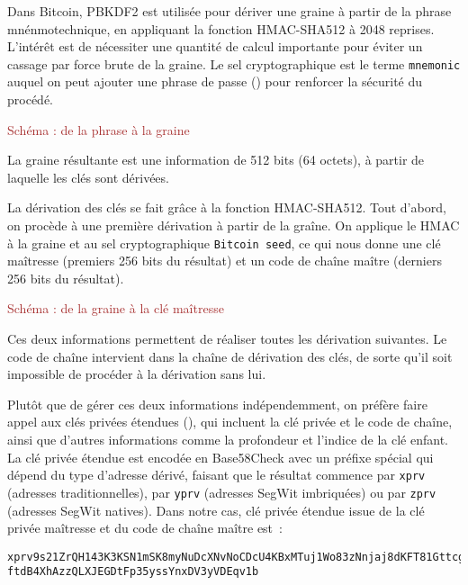 Dans Bitcoin, PBKDF2 est utilisée pour dériver une graine à partir de la phrase mnénmotechnique, en appliquant la fonction HMAC-SHA512 à 2048 reprises. L'intérêt est de nécessiter une quantité de calcul importante pour éviter un cassage par force brute de la graine. Le sel cryptographique est le terme \verb?mnemonic? auquel on peut ajouter une phrase de passe () pour renforcer la sécurité du procédé.

\textcolor{brown}{Schéma : de la phrase à la graine}

La graine résultante est une information de 512 bits (64 octets), à partir de laquelle les clés sont dérivées.


La dérivation des clés se fait grâce à la fonction HMAC-SHA512. Tout d'abord, on procède à une première dérivation à partir de la graîne. On applique le HMAC à la graine et au sel cryptographique \verb?Bitcoin seed?, ce qui nous donne une clé maîtresse (premiers 256 bits du résultat) et un code de chaîne maître (derniers 256 bits du résultat). 

\textcolor{brown}{Schéma : de la graine à la clé maîtresse}


Ces deux informations permettent de réaliser toutes les dérivation suivantes. Le code de chaîne intervient dans la chaîne de dérivation des clés, de sorte qu'il soit impossible de procéder à la dérivation sans lui.

Plutôt que de gérer ces deux informations indépendemment, on préfère faire appel aux clés privées étendues (), qui incluent la clé privée et le code de chaîne, ainsi que d'autres informations comme la profondeur et l'indice de la clé enfant. La clé privée étendue est encodée en Base58Check avec un préfixe spécial qui dépend du type d'adresse dérivé, faisant que le résultat commence par \verb?xprv? (adresses traditionnelles), par \verb?yprv? (adresses SegWit imbriquées) ou par \verb?zprv? (adresses SegWit natives). Dans notre cas, clé privée étendue issue de la clé privée maîtresse et du code de chaîne maître est~:

\begin{Verbatim}[fontsize=\footnotesize]
xprv9s21ZrQH143K3KSN1mSK8myNuDcXNvNoCDcU4KBxMTuj1Wo83zNnjaj8dKFT81GttcgP
ftdB4XhAzzQLXJEGDtFp35yssYnxDV3yVDEqv1b
\end{Verbatim}

